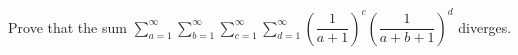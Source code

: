 Prove that the sum $\displaystyle\sum_{a=1}^{\infty}\sum_{b=1}^{\infty}\sum_{c=1}^{\infty}\sum_{d=1}^{\infty}\left(\dfrac1{a+1}\right)^c\left(\dfrac1{a+b+1}\right)^d$ diverges.
